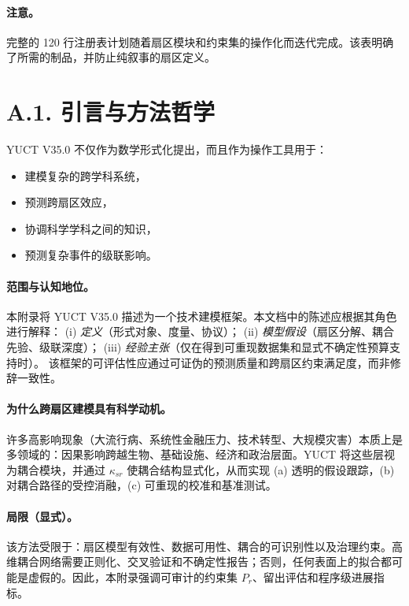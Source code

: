 \documentclass[11pt,a4paper]{article}
\begin{document}
	\paragraph{注意。}
	完整的 120 行注册表计划随着扇区模块和约束集的操作化而迭代完成。该表明确了所需的制品，并防止纯叙事的扇区定义。
	
	\section*{A.1. 引言与方法哲学}
	
	YUCT V35.0 不仅作为数学形式化提出，而且作为操作工具用于：
	\begin{itemize}[leftmargin=*]
		\item 建模复杂的跨学科系统，
		\item 预测跨扇区效应，
		\item 协调科学学科之间的知识，
		\item 预测复杂事件的级联影响。
	\end{itemize}
	\paragraph{范围与认知地位。}
	本附录将 YUCT V35.0 描述为一个技术建模框架。本文档中的陈述应根据其角色进行解释：
	(i) \emph{定义}（形式对象、度量、协议）；
	(ii) \emph{模型假设}（扇区分解、耦合先验、级联深度）；
	(iii) \emph{经验主张}（仅在得到可重现数据集和显式不确定性预算支持时）。
	该框架的可评估性应通过可证伪的预测质量和跨扇区约束满足度，而非修辞一致性。
	
	\paragraph{为什么跨扇区建模具有科学动机。}
	许多高影响现象（大流行病、系统性金融压力、技术转型、大规模灾害）本质上是多领域的：因果影响跨越生物、基础设施、经济和政治层面。YUCT 将这些层视为耦合模块，并通过 $\kappa_{sr}$ 使耦合结构显式化，从而实现 (a) 透明的假设跟踪，(b) 对耦合路径的受控消融，(c) 可重现的校准和基准测试。
	
	\paragraph{局限（显式）。}
	该方法受限于：扇区模型有效性、数据可用性、耦合的可识别性以及治理约束。高维耦合网络需要正则化、交叉验证和不确定性报告；否则，任何表面上的拟合都可能是虚假的。因此，本附录强调可审计的约束集 $P_r$、留出评估和程序级进展指标。
	
\end{document}
